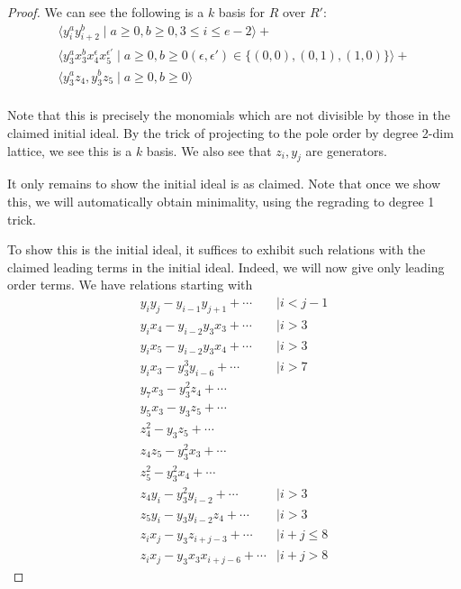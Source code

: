 \documentclass{amsart}
\theoremstyle{plain}
\theoremstyle{definition}
\theoremstyle{remark}
\numberwithin{equation}{section}
\begin{document}
\begin{proof}
We can see the following is a $k$ basis for $R$ over $R'$:
\begin{align*}
	\langle y_i^ay_{i+2}^b \mid a \geq 0,b\geq 0, 3 \leq i \leq e-2\rangle +\\
	\langle y_3^ax_3^b x_4^\epsilon x_5^{\epsilon'} \mid a \geq 0,
			b \geq 0(\epsilon,\epsilon') \in \{(0,0),(0,1),(1,0)\} \rangle +\\
	\langle y_3^az_4,y_3^bz_5 \mid a \geq 0, b \geq 0 \rangle\\
\end{align*}

\noindent
Note that this is precisely the monomials which are not divisible
by those in the claimed initial ideal. By the trick of projecting
to the pole order by degree 2-dim lattice, we see this is a $k$
basis. We also see that $z_i,y_j$ are generators. 

It only remains to show the initial ideal is as claimed. Note that
once we show this, we will automatically obtain minimality, using
the regrading to degree 1 trick.

To show this is the initial ideal, it suffices to exhibit such
relations with the claimed leading terms in the initial ideal.
Indeed, we will now give only leading order terms. We have
relations starting with
\begin{align*}
	y_iy_j - y_{i-1}y_{j+1} + \cdots &\mid i < j-1 \\
	y_ix_4 - y_{i-2}y_3x_3 + \cdots & \mid i > 3\\
	y_ix_5 - y_{i-2}y_3x_4 + \cdots & \mid i > 3\\
	y_ix_3-y_3^3y_{i-6} + \cdots &\mid i > 7\\
	y_7x_3-y_3^2 z_4 + \cdots \\
	y_5x_3 - y_3z_5 + \cdots \\
	z_4^2 - y_3 z_5 + \cdots \\
	z_4z_5 - y_3^2x_3 + \cdots \\
 	z_5^2 - y_3^2 x_4 + \cdots \\
 	z_4 y_i - y_3^2 y_{i-2} + \cdots &\mid i > 3 \\
 	z_5 y_i - y_3y_{i-2}z_4 + \cdots &\mid i > 3 \\
 	z_i x_j - y_3 z_{i+j-3} + \cdots &\mid i+j \leq 8 \\
 	z_i x_j - y_3x_3x_{i+j-6} + \cdots &\mid i+j > 8
\end{align*}
\end{proof}
\end{document}

